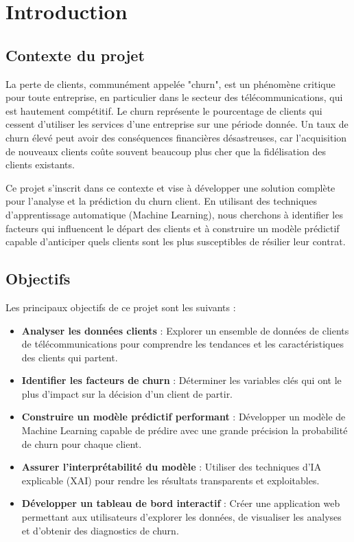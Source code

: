 \chapter{Introduction}
\label{chap:introduction}

\section{Contexte du projet}
La perte de clients, communément appelée "churn", est un phénomène critique pour toute entreprise, en particulier dans le secteur des télécommunications, qui est hautement compétitif. Le churn représente le pourcentage de clients qui cessent d'utiliser les services d'une entreprise sur une période donnée. Un taux de churn élevé peut avoir des conséquences financières désastreuses, car l'acquisition de nouveaux clients coûte souvent beaucoup plus cher que la fidélisation des clients existants.

Ce projet s'inscrit dans ce contexte et vise à développer une solution complète pour l'analyse et la prédiction du churn client. En utilisant des techniques d'apprentissage automatique (Machine Learning), nous cherchons à identifier les facteurs qui influencent le départ des clients et à construire un modèle prédictif capable d'anticiper quels clients sont les plus susceptibles de résilier leur contrat.

\section{Objectifs}
Les principaux objectifs de ce projet sont les suivants :
\begin{itemize}[label=\textcolor{maincolor}{\textbullet}]
    \item \textbf{Analyser les données clients} : Explorer un ensemble de données de clients de télécommunications pour comprendre les tendances et les caractéristiques des clients qui partent.
    \item \textbf{Identifier les facteurs de churn} : Déterminer les variables clés qui ont le plus d'impact sur la décision d'un client de partir.
    \item \textbf{Construire un modèle prédictif performant} : Développer un modèle de Machine Learning capable de prédire avec une grande précision la probabilité de churn pour chaque client.
    \item \textbf{Assurer l'interprétabilité du modèle} : Utiliser des techniques d'IA explicable (XAI) pour rendre les résultats transparents et exploitables.
    \item \textbf{Développer un tableau de bord interactif} : Créer une application web permettant aux utilisateurs d'explorer les données, de visualiser les analyses et d'obtenir des diagnostics de churn.
\end{itemize}

